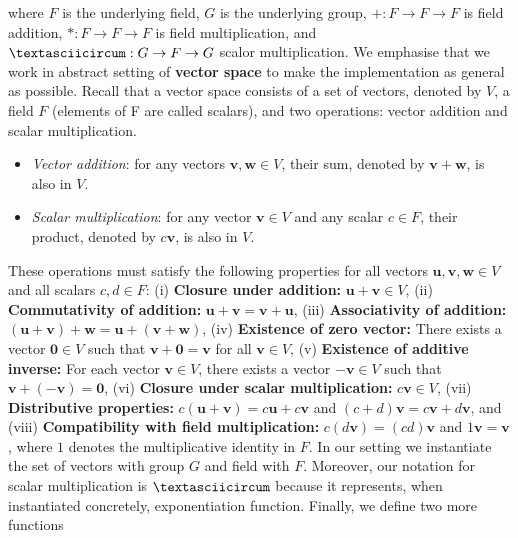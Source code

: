 \documentclass[sigconf]{acmart}
\begin{document}
 where $F$ is the underlying field, $G$ is the underlying group,
 $+ : F \rightarrow F \rightarrow F$ is field addition,
 $* : F \rightarrow F \rightarrow F$ is field multiplication, and
 $\textasciicircum : G \rightarrow F \rightarrow G$ scalor multiplication. 
 We emphasise that we work in abstract setting of \textbf{vector space} to 
 make the implementation as general as possible. Recall that a vector space consists of a set of 
 vectors, denoted by \(V\), a field \(F\) (elements of F are called scalars), and 
 two operations: vector addition and scalar multiplication.

\begin{itemize}
    \item \textit{Vector addition}: for any vectors \(\mathbf{v}, \mathbf{w} \in V\), their sum, denoted by \(\mathbf{v} + \mathbf{w}\), is also in \(V\).
    \item \textit{Scalar multiplication}: for any vector \(\mathbf{v} \in V\) and any scalar \(c \in F\), their product, denoted by \(c\mathbf{v}\), is also in \(V\).
\end{itemize}

These operations must satisfy the following properties for all vectors \(\mathbf{u}, \mathbf{v}, \mathbf{w} \in V\) and all scalars \(c, d \in F\):
(i) \textbf{Closure under addition:} \(\mathbf{u} + \mathbf{v} \in V\), (ii) \textbf{Commutativity of addition:} \(\mathbf{u} + \mathbf{v} = \mathbf{v} + \mathbf{u}\), 
(iii)  \textbf{Associativity of addition:} \((\mathbf{u} + \mathbf{v}) + \mathbf{w} = \mathbf{u} + (\mathbf{v} + \mathbf{w})\), 
(iv) \textbf{Existence of zero vector:} There exists a vector \(\mathbf{0} \in V\) such that \(\mathbf{v} + \mathbf{0} = \mathbf{v}\) for all \(\mathbf{v} \in V\), 
(v) \textbf{Existence of additive inverse:} For each vector \(\mathbf{v} \in V\), there exists a vector \(-\mathbf{v} \in V\) such that \(\mathbf{v} + (-\mathbf{v}) = \mathbf{0}\),
(vi) \textbf{Closure under scalar multiplication:} \(c\mathbf{v} \in V\), 
(vii) \textbf{Distributive properties:} \(c(\mathbf{u} + \mathbf{v}) = c\mathbf{u} + c\mathbf{v}\) and \((c + d)\mathbf{v} = c\mathbf{v} + d\mathbf{v}\), 
and (viii) \textbf{Compatibility with field multiplication:} \(c(d\mathbf{v}) = (cd)\mathbf{v}\) and \(1\mathbf{v} = \mathbf{v}\), where \(1\) denotes the multiplicative identity in \(F\).
In our setting we instantiate the set of vectors with group $G$ and field with $F$. Moreover, our notation for scalar multiplication 
is $\textasciicircum$ because it represents, when instantiated concretely, exponentiation function. Finally, 
we define two more functions 
\end{document}
